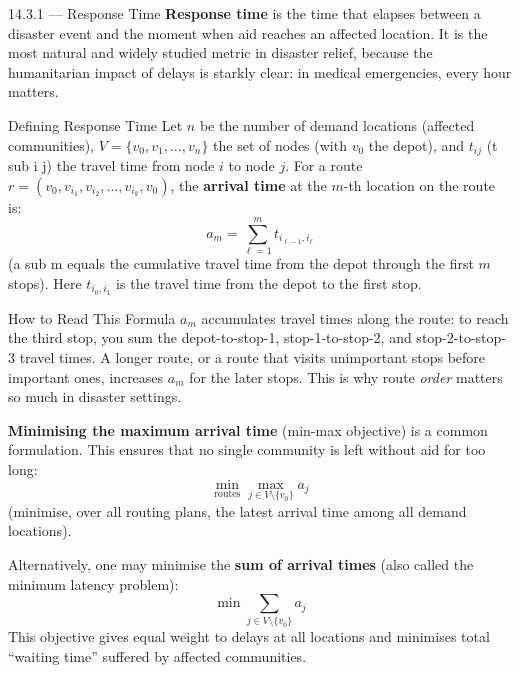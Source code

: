 \documentclass[aspectratio=169,10pt]{beamer}
\begin{document}
\begin{frame}[allowframebreaks]{14.3.1 --- Response Time}
  \textbf{Response time} is the time that elapses between a disaster
  event and the moment when aid reaches an affected location.
  It is the most natural and widely studied metric in disaster relief,
  because the humanitarian impact of delays is starkly clear: in medical
  emergencies, every hour matters.

  \medskip
  \begin{block}{Defining Response Time}
    Let $n$ be the number of demand locations (affected communities),
    $V = \{v_0, v_1, \ldots, v_n\}$ the set of nodes (with $v_0$ the depot),
    and $t_{ij}$ (t sub i j) the travel time from node $i$ to node $j$.
    For a route $r = (v_0, v_{i_1}, v_{i_2}, \ldots, v_{i_k}, v_0)$,
    the \textbf{arrival time} at the $m$-th location on the route is:
    \[
      a_m = \sum_{\ell=1}^{m} t_{i_{\ell-1}, i_\ell}
    \]
    (a sub m equals the cumulative travel time from the depot through
    the first $m$ stops).
    Here $t_{i_0, i_1}$ is the travel time from the depot to the first stop.
  \end{block}

  \begin{alertblock}{How to Read This Formula}
    $a_m$ accumulates travel times along the route: to reach the third
    stop, you sum the depot-to-stop-1, stop-1-to-stop-2, and
    stop-2-to-stop-3 travel times.
    A longer route, or a route that visits unimportant stops before
    important ones, increases $a_m$ for the later stops.
    This is why route \emph{order} matters so much in disaster settings.
  \end{alertblock}

  \framebreak

  \textbf{Minimising the maximum arrival time} (min-max objective)
  is a common formulation. This ensures that no single community is
  left without aid for too long:
  \[
    \min_{\text{routes}} \max_{j \in V \setminus \{v_0\}} a_j
  \]
  (minimise, over all routing plans, the latest arrival time among
  all demand locations).

  \medskip
  Alternatively, one may minimise the \textbf{sum of arrival times}
  (also called the minimum latency problem):
  \[
    \min \sum_{j \in V \setminus \{v_0\}} a_j
  \]
  This objective gives equal weight to delays at all locations and
  minimises total ``waiting time'' suffered by affected communities.


\end{frame}
\end{document}
